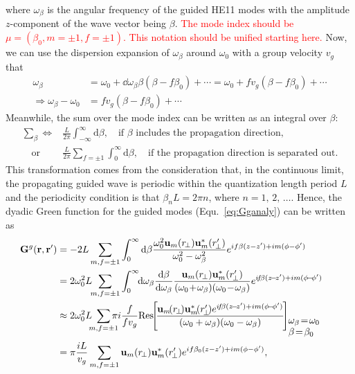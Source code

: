 where $ \omega_\beta $ is the angular frequency of the guided HE11 modes with the amplitude $ z $-component of the wave vector being $ \beta $. \textcolor{red}{The mode index should be $ \mu=(\beta_0,m=\pm 1,f=\pm 1) $. This notation should be unified starting here.} Now, we can use the dispersion expansion of $ \omega_\beta $ around $ \omega_0 $ with a group velocity $ v_g $ that 
\begin{align}
\omega_\beta &=\omega_0 + \dd{\omega_\beta}{\beta}(\beta-f\beta_0) +\cdots = \omega_0 + fv_g(\beta-f\beta_0) +\cdots\\
\Rightarrow \omega_\beta - \omega_0 &= fv_g(\beta-f\beta_0) +\cdots
\end{align}
Meanwhile, the sum over the mode index can be written as an integral over $ \beta $:
\begin{align}
\sum_{\beta} \Leftrightarrow & \frac{L}{2\pi} \int_{-\infty}^{\infty} \mathrm{d}\beta, \quad \text{if $\beta$ includes the propagation direction},\\
\quad \mathrm{or}\quad &\frac{L}{2\pi}\sum_{f=\pm 1} \int_0^{\infty} \mathrm{d}\beta,\quad\text{if the propagation direction is separated out}.
\end{align}
This  transformation comes from the consideration that, in the continuous limit, the propagating guided wave is periodic within the quantization length period $ L $ and the periodicity condition is that $ \beta_n L=2\pi n $, where $ n=1,\,2,\,\ldots $. Hence, the dyadic Green function for the guided modes (Equ.~\eqref{eq:Gganaly}) can be written as
\begin{align}
\!\!\!\!\!\!\!\!\! \mathbf{G}^g(\br,\br') &= -2L\sum_{m,f=\pm 1}\int_0^\infty \mathrm{d}\beta \frac{\omega_0^2\mathbf{u}_{m}(r\!_\perp)\mathbf{u}^*_{m}(r_{\!\perp}^\prime)}{\omega_0^2-\omega_\beta^2}e^{if\beta(z-z')+im(\phi-\phi')}\\
&= 2\omega_0^2 L\!\!\sum_{m,f=\pm 1}\int_0^\infty\!\! \mathrm{d}\omega_\beta \frac{\mathrm{d}\beta}{\mathrm{d}\omega_\beta} \frac{\mathbf{u}_{m}(r\!_\perp)\mathbf{u}^*_{m}(r_{\!\perp}^\prime)}{(\omega_0\! +\!\omega_\beta) (\omega_0\!-\!\omega_\beta)} e^{i\!f\!\beta(z\!-\!z')+im(\phi\!-\!\phi')}\label{eq:eigGFintegral}\\
&\approx 2\omega_0^2L \!\!\! \sum_{m,f=\pm 1}\!\!\!\!\! \pi i\,\!  \frac{f}{fv_g} \mathrm{Res}\!\! \left[\! \frac{\mathbf{u}_{m}\!(r\!_\perp\! ) \mathbf{u}^*_{m}\! (r_{\!\perp}^\prime\! ) e^{i\! f\! \beta(z \!-\! z')+im(\phi\!-\! \phi')} }{(\omega_0+\omega_\beta)(\omega_0-\omega_\beta)} \!\right]\!\!\!\!_{\begin{array}{l} \omega_\beta\! =\!\omega_0 \\ \beta\! =\!\beta_0\end{array} }\\
&= \pi\frac{iL}{v_g} \sum_{m,f=\pm 1} \mathbf{u}_{m}(r\!_\perp)\mathbf{u}^*_{m}(r_{\!\perp}^\prime)e^{if\beta_0(z-z')+im(\phi-\phi')},
\end{align}
